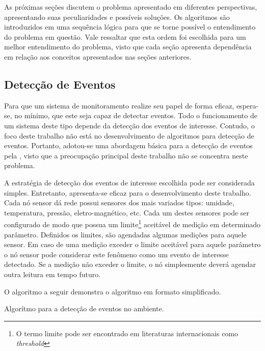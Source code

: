 As próximas seções discutem o problema apresentado em diferentes perspectivas, apresentando suas peculiaridades e possíveis
soluções. Os algoritmos são introduzidos em uma sequência lógica para que se torne possível o entendimento do problema em questão. Vale 
ressaltar que esta ordem foi escolhida para um melhor entendimento do problema, visto que cada seção apresenta dependência em relação aos conceitos
apresentados nas seções anteriores. 

\subsection{Detecção de Eventos}
Para que um sistema de monitoramento realize seu papel de forma eficaz, espera-se, no mínimo, que este seja capaz de detectar eventos. Todo o funcionamento
de um sistema deste tipo depende da detecção dos eventos de interesse. Contudo, o foco deste trabalho não está no desenvolvimento de algoritmos para 
detecção de eventos. Portanto, adotou-se uma abordagem básica para a detecção de eventos pela \rssf, visto que a preocupação principal deste trabalho não se concentra neste problema.

A estratégia de detecção dos eventos de interesse escolhida pode ser considerada simples. Entretanto, apresenta-se eficaz para o desenvolvimento deste trabalho.
Cada nó sensor dá rede possui sensores dos mais variados tipos: umidade, temperatura, pressão, eletro-magnético, etc. Cada um destes sensores pode ser
configurado de modo que possua um limite\footnote{O termo limite pode ser encontrado em literaturas internacionais como \emph{threshold}} aceitável de medição em determinado parâmetro. Definidos os limites, são agendadas algumas medições para aquele sensor. Em caso de uma medição exceder o limite aceitável
para aquele parâmetro o nó sensor pode considerar este fenômeno como um evento de interesse detectado. Se a medição não exceder o limite, o nó simplesmente
deverá agendar outra leitura em tempo futuro.

O algoritmo a seguir demonstra o algoritmo em formato simplificado. \\

\begin{algorithm}[H]
	

	
\caption{Algorítmo para a detecção de eventos no ambiente.}
\end{algorithm}



